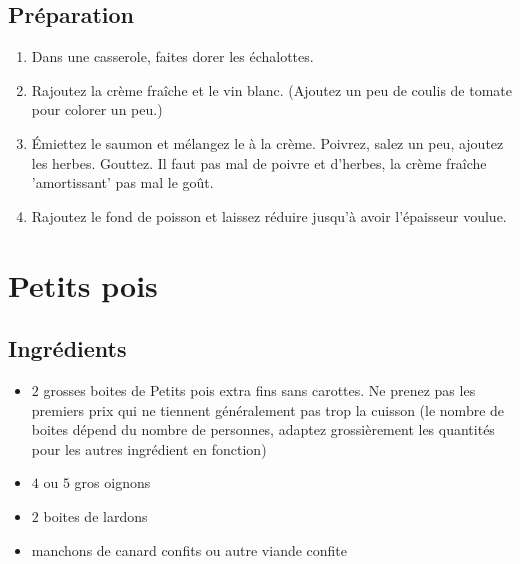 \subsection*{Préparation}
\begin{enumerate}
\item Dans une casserole, faites dorer les échalottes. 
\item Rajoutez la crème fraîche et le vin blanc. (Ajoutez un peu de coulis de tomate pour colorer un peu.)
\item Émiettez le saumon et mélangez le à la crème. Poivrez, salez un peu, ajoutez les herbes. Gouttez. Il faut pas mal de poivre et d'herbes, la crème fraîche 'amortissant' pas mal le goût.
\item Rajoutez le fond de poisson et laissez réduire jusqu'à avoir l'épaisseur voulue.
\end{enumerate}

\newpage
\section{Petits pois}
\subsection*{Ingrédients}
\begin{itemize}
\item $2$ grosses boites de Petits pois extra fins sans carottes. Ne prenez pas les premiers prix qui ne tiennent généralement pas trop la cuisson (le nombre de boites dépend du nombre de personnes, adaptez grossièrement les quantités pour les autres ingrédient en fonction)
\item $4$ ou $5$ gros oignons
\item $2$ boites de lardons
\item manchons de canard confits ou autre viande confite
\end{itemize}

